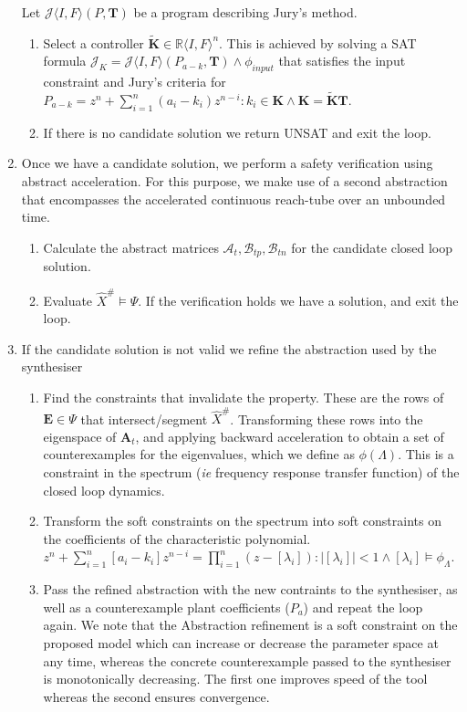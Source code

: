 \documentclass[runningheads,a4paper]{llncs}
\newcommand{\mat}[1]{\boldsymbol{#1}}
\begin{document}
\begin{enumerate}
Let $\mathcal{J}\langle I,F \rangle (P,\mat{T})$ be a program describing Jury's method.
\begin{enumerate}
\item Select a controller $\tilde{\mat{K}} \in \mathbb{R}\langle I,F\rangle^n$. This is achieved by solving a SAT formula $\mathcal{J}_K=\mathcal{J}\langle I,F \rangle (P_{a-k},\mat{T})\wedge \phi_{input}$ that satisfies the input constraint and Jury's criteria for $P_{a-k}=z^n+\sum_{i=1}^n (a_i-k_i) z^{n-i} : k_i \in \mat{K} \wedge \mat{K}=\tilde{\mat{K}}\mat{T}$.
\item If there is no candidate solution we return UNSAT and exit the loop.
\end{enumerate}
\item Once we have a candidate solution, we perform a safety verification using abstract acceleration. For this purpose, we make use of a second abstraction that encompasses the accelerated continuous reach-tube over an unbounded time. %

\begin{enumerate}
\item Calculate the abstract matrices $\mathcal{A}_t, \mathcal{B}_{tp},\mathcal{B}_{tn}$ for the candidate closed loop solution.
\item Evaluate $\hat{X}^\# \models \Psi$. If the verification holds we have a solution, and exit the loop.
\end{enumerate} 
\item If the candidate solution is not valid we refine the abstraction used by the synthesiser
\begin{enumerate}
\item Find the constraints that invalidate the property. These are the rows of $\mat{E} \in \Psi$ that intersect/segment $\hat{X}^\#$. Transforming these rows into the eigenspace of $\mat{A}_t$, and applying backward acceleration to obtain a set of counterexamples for the eigenvalues, which we define as $\phi(\Lambda)$. This is a constraint in the spectrum (\emph{ie} frequency response transfer function) of the closed loop dynamics. 
\item Transform the soft constraints on the spectrum into soft constraints on the coefficients of the characteristic polynomial. 
$z^n+\sum_{i=1}^n[a_i-k_i]z^{n-i}=\prod_{i=1}^n (z-[\lambda_i]) : |[\lambda_i]|<1 \wedge [\lambda_i] \models \phi_{\Lambda}$.
\item Pass the refined abstraction with the new contraints to the synthesiser, as well as a counterexample plant coefficients ($P_a$) and repeat the loop again. We note that the Abstraction refinement is a soft constraint on the proposed model which can increase or decrease the parameter space at any time, whereas the concrete counterexample passed to the synthesiser is monotonically decreasing. The first one improves speed of the tool whereas the second ensures convergence.

\end{enumerate} 
\end{enumerate}
\end{document}

